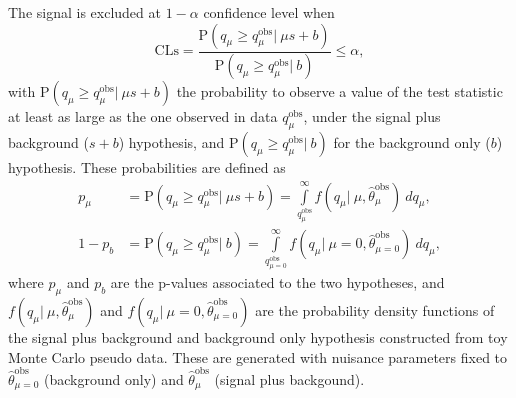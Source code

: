 The signal is excluded at $1-\alpha$ confidence level when 
\begin{equation}
\mathrm{CLs} = \frac{\mathrm{P}\left(q_{\mu} \geq q_{\mu}^{\mathrm{obs}}|\: \mu s + b\right)}{\mathrm{P}\left(q_{\mu} \geq q_{\mu}^{\mathrm{obs}}| \:b\right)} \leq \alpha, 
\end{equation}
with $ \mathrm{P}\left(q_{\mu} \geq q_{\mu}^{\mathrm{obs}}|\: \mu s + b\right)$ the probability to observe a value of the test statistic at least as large as the one observed in data $q_{\mu}^{\mathrm{obs}}$, under the signal plus background ($s+b$) hypothesis, and $\mathrm{P}\left(q_{\mu} \geq q_{\mu}^{\mathrm{obs}}|\:  b\right)$ for the background only ($b$) hypothesis. 
These probabilities are defined as 
\begin{equation}
\begin{aligned}
  p_{\mu} &= \mathrm{P}\left(q_{\mu} \geq q_{\mu}^{\mathrm{obs}}|\: \mu s + b\right) = \int \limits_{q^{\mathrm{obs}}_{\mu}}^{\infty} f(q_{\mu}|\: \mu, \hat{\theta}_{\mu}^{\mathrm{obs}}) \:dq_{\mu}, \\
  1-p_{b} &= \mathrm{P}\left(q_{\mu} \geq q_{\mu}^{\mathrm{obs}}|\:  b\right) = \int \limits_{q^{\mathrm{obs}}_{\mu=0}}^{\infty} f(q_{\mu}|\: \mu=0, \hat{\theta}_{\mu=0}^{\mathrm{obs}}) \:dq_{\mu}, 
\end{aligned}
\end{equation}
where $ p_{\mu}$ and $ p_{b}$ are the p-values associated to the two hypotheses, and  $f(q_{\mu}|\: \mu, \hat{\theta}_{\mu}^{\mathrm{obs}})$ and $f(q_{\mu}|\: \mu=0, \hat{\theta}_{\mu=0}^{\mathrm{obs}})$ are the probability density functions of the signal plus background and background only hypothesis constructed from toy Monte Carlo pseudo data. These are generated with nuisance parameters fixed to $\hat{\theta}_{\mu=0}^{\mathrm{obs}}$ (background only) and $\hat{\theta}_{\mu}^{\mathrm{obs}}$ (signal plus backgound).
